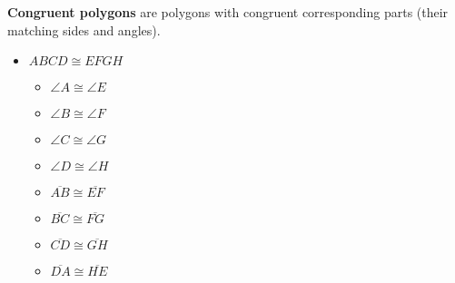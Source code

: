 \documentclass{article}
\begin{document}
\begin{tcolorbox}[colframe=black!20!white, opacitybacktitle=0.1, coltitle=black, title=\textbf{Congruent Polygons}]
\textbf{Congruent polygons} are polygons with congruent corresponding parts (their matching sides and angles). \newline

\begin{minipage}{0.5\textwidth}
\begin{itemize}
    \item $ABCD \cong EFGH$
    \begin{multicols}{2}
    \begin{itemize}
    \item $\angle A \cong \angle E$ 
    \item $\angle B \cong \angle F$ 
    \item $\angle C \cong \angle G$ 
    \item $\angle D \cong \angle H$
    \end{itemize}
    \begin{itemize}
        \item $\overline{AB} \cong \overline{EF}$
        \item $\overline{BC} \cong \overline{FG}$
        \item $\overline{CD} \cong \overline{GH}$
        \item $\overline{DA} \cong \overline{HE}$
    \end{itemize}
    \end{multicols}
\end{itemize}
\end{minipage}
\begin{minipage}{0.45\textwidth}
    \hspace{0.25in}
\end{minipage}
\end{tcolorbox}
\bigskip 
\end{document}
